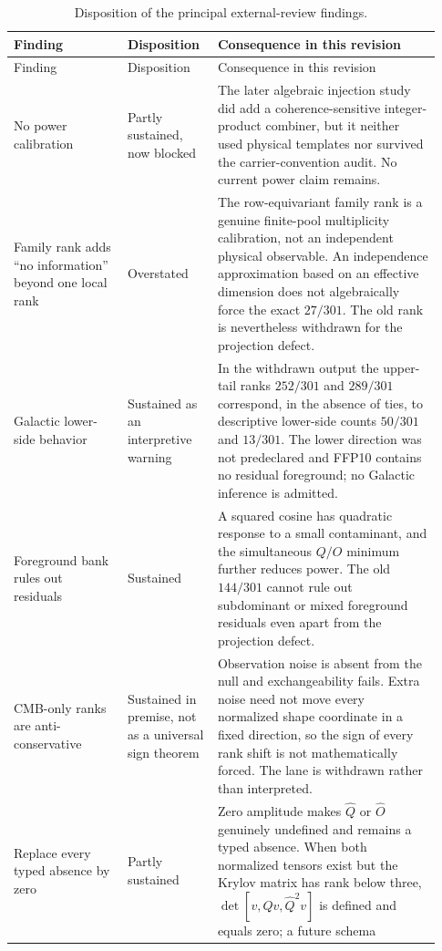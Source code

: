 \documentclass[11pt,a4paper]{article}
\begin{document}
\begin{longtable}{@{}p{0.25\linewidth}p{0.19\linewidth}p{0.49\linewidth}@{}}
\caption{Disposition of the principal external-review findings.}
\label{tab:referee-disposition}\\
\toprule
Finding & Disposition & Consequence in this revision\\
\midrule
\endfirsthead
\toprule
Finding & Disposition & Consequence in this revision\\
\midrule
\endhead
No power calibration & Partly sustained, now blocked & The later algebraic
injection study did add a coherence-sensitive integer-product combiner, but it
neither used physical templates nor survived the carrier-convention audit.
No current power claim remains.\\
Family rank adds ``no information'' beyond one local rank & Overstated & The
row-equivariant family rank is a genuine finite-pool multiplicity calibration,
not an independent physical observable.  An independence approximation based
on an effective dimension does not algebraically force the exact $27/301$.
The old rank is nevertheless withdrawn for the projection defect.\\
Galactic lower-side behavior & Sustained as an interpretive warning & In the
withdrawn output the upper-tail ranks $252/301$ and $289/301$ correspond, in
the absence of ties, to descriptive lower-side counts $50/301$ and $13/301$.
The lower direction was not predeclared and FFP10 contains no residual
foreground; no Galactic inference is admitted.\\
Foreground bank rules out residuals & Sustained & A squared cosine has
quadratic response to a small contaminant, and the simultaneous $Q/O$ minimum
further reduces power.  The old $144/301$ cannot rule out subdominant or mixed
foreground residuals even apart from the projection defect.\\
CMB-only ranks are anti-conservative & Sustained in premise, not as a universal
sign theorem & Observation noise is absent from the null and exchangeability
fails.  Extra noise need not move every normalized shape coordinate in a fixed
direction, so the sign of every rank shift is not mathematically forced.  The
lane is withdrawn rather than interpreted.\\
Replace every typed absence by zero & Partly sustained & Zero amplitude makes
$\widehat Q$ or $\widehat O$ genuinely undefined and remains a typed absence.
When both normalized tensors exist but the Krylov matrix has rank below three,
$\det[v,\widehat Qv,\widehat Q^2v]$ is defined and equals zero; a future schema

\end{longtable}
\end{document}
